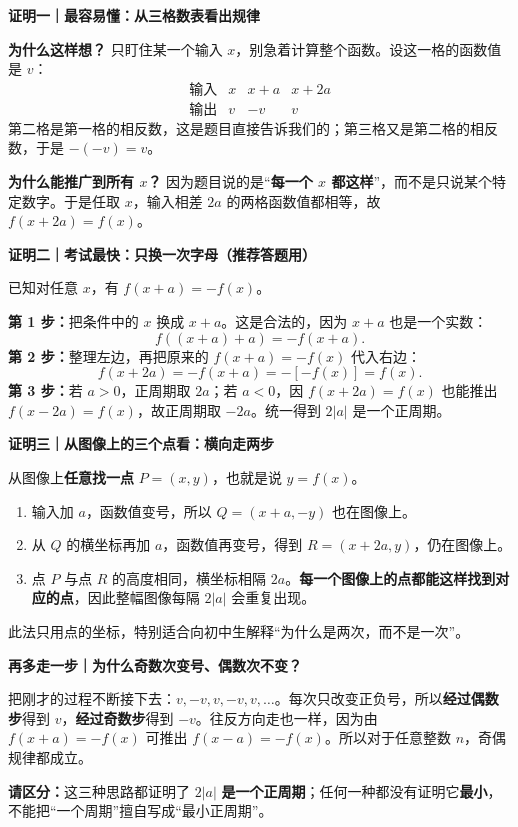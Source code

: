 \clearpage
\begin{proofbox}
\textbf{证明一｜最容易懂：从三格数表看出规律}



\textbf{为什么这样想？} 只盯住某一个输入 $x$，别急着计算整个函数。设这一格的函数值是 $v$：
\[
\begin{array}{c|ccc}
\text{输入}&x&x+a&x+2a\\\hline
\text{输出}&v&-v&v
\end{array}
\]
第二格是第一格的相反数，这是题目直接告诉我们的；第三格又是第二格的相反数，于是 $-(-v)=v$。

\textbf{为什么能推广到所有 $x$？} 因为题目说的是“\textbf{每一个 $x$ 都这样}”，而不是只说某个特定数字。于是任取 $x$，输入相差 $2a$ 的两格函数值都相等，故 $f(x+2a)=f(x)$。

\medskip
\end{proofbox}\clearpage\begin{proofbox}\textbf{证明二｜考试最快：只换一次字母（推荐答题用）}



已知对任意 $x$，有 $f(x+a)=-f(x)$。

\textbf{第 1 步：}把条件中的 $x$ 换成 $x+a$。这是合法的，因为 $x+a$ 也是一个实数：
\[
f((x+a)+a)=-f(x+a).
\]
\textbf{第 2 步：}整理左边，再把原来的 $f(x+a)=-f(x)$ 代入右边：
\[
\boxed{\ f(x+2a)=-f(x+a)=-[-f(x)]=f(x).\ }
\]
\textbf{第 3 步：}若 $a>0$，正周期取 $2a$；若 $a<0$，因 $f(x+2a)=f(x)$ 也能推出 $f(x-2a)=f(x)$，故正周期取 $-2a$。统一得到 $2|a|$ 是一个正周期。

\medskip
\end{proofbox}\clearpage\begin{proofbox}\textbf{证明三｜从图像上的三个点看：横向走两步}



从图像上\textbf{任意找一点} $P=(x,y)$，也就是说 $y=f(x)$。
\begin{enumerate}[leftmargin=*,itemsep=0.25em]
\item 输入加 $a$，函数值变号，所以 $Q=(x+a,-y)$ 也在图像上。
\item 从 $Q$ 的横坐标再加 $a$，函数值再变号，得到 $R=(x+2a,y)$，仍在图像上。
\item 点 $P$ 与点 $R$ 的高度相同，横坐标相隔 $2a$。\textbf{每一个图像上的点都能这样找到对应的点}，因此整幅图像每隔 $2|a|$ 会重复出现。
\end{enumerate}
此法只用点的坐标，特别适合向初中生解释“为什么是两次，而不是一次”。

\medskip
\end{proofbox}\clearpage\begin{proofbox}

\textbf{再多走一步｜为什么奇数次变号、偶数次不变？}

把刚才的过程不断接下去：$v,-v,v,-v,v,\dots$。每次只改变正负号，所以\textbf{经过偶数步}得到 $v$，\textbf{经过奇数步}得到 $-v$。往反方向走也一样，因为由 $f(x+a)=-f(x)$ 可推出 $f(x-a)=-f(x)$。所以对于任意整数 $n$，奇偶规律都成立。

\textbf{请区分：}这三种思路都证明了 $2|a|$ \textbf{是一个正周期}；任何一种都没有证明它\textbf{最小}，不能把“一个周期”擅自写成“最小正周期”。
\end{proofbox}
